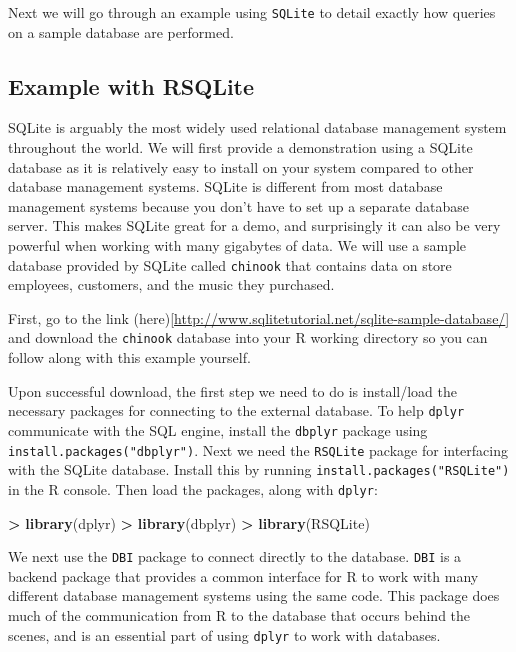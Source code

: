 \documentclass[]{krantz}
\makeatletter
\newenvironment{Shaded}{\begin{snugshade}}{\end{snugshade}}
\newcommand{\KeywordTok}[1]{\textcolor[rgb]{0.27,0.27,0.27}{\textbf{#1}}}
\newcommand{\NormalTok}[1]{#1}
\newcommand{\OperatorTok}[1]{\textcolor[rgb]{0.43,0.43,0.43}{\textbf{#1}}}
\newcommand{\StringTok}[1]{\textcolor[rgb]{0.5,0.5,0.5}{#1}}
\newenvironment{kframe}{%
\medskip{}
\setlength{\fboxsep}{.8em}
 \def\at@end@of@kframe{}%
 \ifinner\ifhmode%
  \def\at@end@of@kframe{\end{minipage}}%
  \begin{minipage}{\columnwidth}%
 \fi\fi%
 \def\FrameCommand##1{\hskip\@totalleftmargin \hskip-\fboxsep
 \colorbox{shadecolor}{##1}\hskip-\fboxsep
     \hskip-\linewidth \hskip-\@totalleftmargin \hskip\columnwidth}%
 \MakeFramed {\advance\hsize-\width
   \@totalleftmargin\z@ \linewidth\hsize
   \@setminipage}}%
 {\par\unskip\endMakeFramed%
 \at@end@of@kframe}
\renewenvironment{Shaded}{\begin{kframe}}{\end{kframe}}
\makeatother
\begin{document}
Next we will go through an example using \texttt{SQLite} to detail exactly how queries on a sample database are performed.

\hypertarget{example-with-rsqlite}{%
\subsection{Example with RSQLite}\label{example-with-rsqlite}}

SQLite is arguably the most widely used relational database management system throughout the world. We will first provide a demonstration using a SQLite database as it is relatively easy to install on your system compared to other database management systems. SQLite is different from most database management systems because you don't have to set up a separate database server. This makes SQLite great for a demo, and surprisingly it can also be very powerful when working with many gigabytes of data. We will use a sample database provided by SQLite called \texttt{chinook} that contains data on store employees, customers, and the music they purchased.

First, go to the link (here){[}\url{http://www.sqlitetutorial.net/sqlite-sample-database/}{]} and download the \texttt{chinook} database into your R working directory so you can follow along with this example yourself.

Upon successful download, the first step we need to do is install/load the necessary packages for connecting to the external database. To help \texttt{dplyr} communicate with the SQL engine, install the \texttt{dbplyr} package using \texttt{install.packages("dbplyr")}. Next we need the \texttt{RSQLite} package for interfacing with the SQLite database. Install this by running \texttt{install.packages("RSQLite")} in the R console. Then load the packages, along with \texttt{dplyr}:

\begin{Shaded}
\begin{Highlighting}[]
\OperatorTok{>}\StringTok{ }\KeywordTok{library}\NormalTok{(dplyr)}
\OperatorTok{>}\StringTok{ }\KeywordTok{library}\NormalTok{(dbplyr)}
\OperatorTok{>}\StringTok{ }\KeywordTok{library}\NormalTok{(RSQLite)}
\end{Highlighting}
\end{Shaded}

We next use the \texttt{DBI} package to connect directly to the database. \texttt{DBI} is a backend package that provides a common interface for R to work with many different database management systems using the same code. This package does much of the communication from R to the database that occurs behind the scenes, and is an essential part of using \texttt{dplyr} to work with databases.
\end{document}
